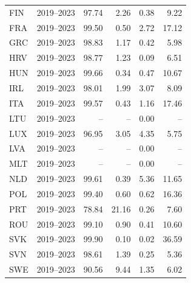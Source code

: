 {\begin{longtable}{@{}lrrrrr@{}}
FIN & 2019–2023 & 97.74 &  2.26 &  0.38 &  9.22 \\
FRA & 2019–2023 & 99.50 &  0.50 &  2.72 & 17.12 \\
GRC & 2019–2023 & 98.83 &  1.17 &  0.42 &  5.98 \\
HRV & 2019–2023 & 98.77 &  1.23 &  0.09 &  6.51 \\
HUN & 2019–2023 & 99.66 &  0.34 &  0.47 & 10.67 \\
IRL & 2019–2023 & 98.01 &  1.99 &  3.07 &  8.09 \\
ITA & 2019–2023 & 99.57 &  0.43 &  1.16 & 17.46 \\
LTU & 2019–2023 & -- & -- &  0.00 & -- \\
LUX & 2019–2023 & 96.95 &  3.05 &  4.35 &  5.75 \\
LVA & 2019–2023 & -- & -- &  0.00 & -- \\
MLT & 2019–2023 & -- & -- &  0.00 & -- \\
NLD & 2019–2023 & 99.61 &  0.39 &  5.36 & 11.65 \\
POL & 2019–2023 & 99.40 &  0.60 &  0.62 & 16.36 \\
PRT & 2019–2023 & 78.84 & 21.16 &  0.26 &  7.60 \\
ROU & 2019–2023 & 99.10 &  0.90 &  0.41 & 10.60 \\
SVK & 2019–2023 & 99.90 &  0.10 &  0.02 & 36.59 \\
SVN & 2019–2023 & 98.61 &  1.39 &  0.25 &  5.36 \\
SWE & 2019–2023 & 90.56 &  9.44 &  1.35 &  6.02 \\
\end{longtable}
\par{}\par
}
